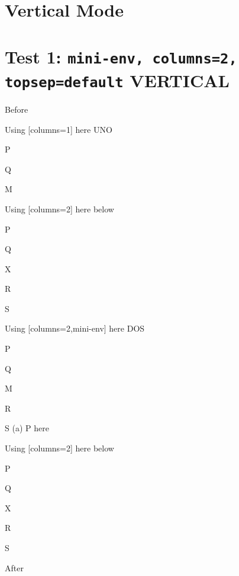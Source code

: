 \documentclass[12pt]{article}
\begin{document}

\newpage
\section*{Vertical Mode}

\section{Test 1: \texttt{mini-env, columns=2, topsep=default} VERTICAL}

Before
\begin{enumext}[columns=2]

\item Using [columns=1] here UNO

  \begin{enumext}[columns=1]%
     \item  P \item Q \item M %
  \end{enumext}

\item Using [columns=2] here below

\begin{enumext}[columns=2]%
     \item  P \item Q \item X  \item R \item S
  \end{enumext}

\columnbreak

\item Using [columns=2,mini-env] here DOS

  \begin{enumext}[columns=2,mini-env={0.4\linewidth}]%
    \item  P \item Q \item M \item R \item S
    \miniright
    (a) P here
  \end{enumext}

\item Using [columns=2] here below

\begin{enumext}[columns=2]%
     \item  P \item Q \item X  \item R \item S
  \end{enumext}

\end{enumext}
After
\end{document}
